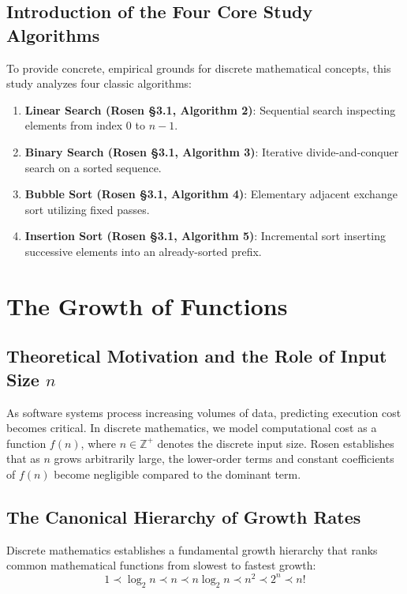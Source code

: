 \documentclass[11pt,a4paper,oneside]{report}
\theoremstyle{definition}
\begin{document}
\section{Introduction of the Four Core Study Algorithms}
To provide concrete, empirical grounds for discrete mathematical concepts, this study analyzes four classic algorithms:
\begin{enumerate}
    \item \textbf{Linear Search (Rosen \S3.1, Algorithm 2)}: Sequential search inspecting elements from index 0 to $n-1$.
    \item \textbf{Binary Search (Rosen \S3.1, Algorithm 3)}: Iterative divide-and-conquer search on a sorted sequence.
    \item \textbf{Bubble Sort (Rosen \S3.1, Algorithm 4)}: Elementary adjacent exchange sort utilizing fixed passes.
    \item \textbf{Insertion Sort (Rosen \S3.1, Algorithm 5)}: Incremental sort inserting successive elements into an already-sorted prefix.
\end{enumerate}

\chapter{The Growth of Functions}
\label{chap:growth_of_functions}

\section{Theoretical Motivation and the Role of Input Size \texorpdfstring{$n$}{n}}
As software systems process increasing volumes of data, predicting execution cost becomes critical. In discrete mathematics, we model computational cost as a function $f(n)$, where $n \in \mathbb{Z}^+$ denotes the discrete input size. Rosen \cite[\S3.2]{Rosen2019} establishes that as $n$ grows arbitrarily large, the lower-order terms and constant coefficients of $f(n)$ become negligible compared to the dominant term.

\section{The Canonical Hierarchy of Growth Rates}
Discrete mathematics establishes a fundamental growth hierarchy that ranks common mathematical functions from slowest to fastest growth:
\begin{equation}
    1 \prec \log_2 n \prec n \prec n \log_2 n \prec n^2 \prec 2^n \prec n!
\end{equation}
\end{document}
